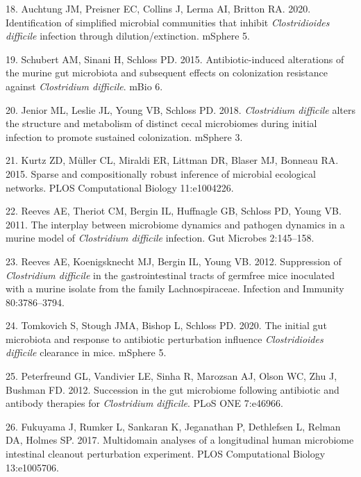 \documentclass[12pt,]{article}
\newlength{\cslhangindent}
\newenvironment{cslreferences}%
  {\setlength{\parindent}{0pt}%
  \everypar{\setlength{\hangindent}{\cslhangindent}}\ignorespaces}%
  {\par}
\begin{document}
\begin{cslreferences}
\leavevmode\hypertarget{ref-auchtung2020}{}%
18. Auchtung JM, Preisner EC, Collins J, Lerma AI, Britton RA. 2020.
Identification of simplified microbial communities that inhibit
\emph{Clostridioides difficile} infection through dilution/extinction.
mSphere 5.

\leavevmode\hypertarget{ref-schubert2015}{}%
19. Schubert AM, Sinani H, Schloss PD. 2015. Antibiotic-induced
alterations of the murine gut microbiota and subsequent effects on
colonization resistance against \emph{Clostridium difficile}. mBio 6.

\leavevmode\hypertarget{ref-jenior2018}{}%
20. Jenior ML, Leslie JL, Young VB, Schloss PD. 2018. \emph{Clostridium
difficile} alters the structure and metabolism of distinct cecal
microbiomes during initial infection to promote sustained colonization.
mSphere 3.

\leavevmode\hypertarget{ref-kurtz2015}{}%
21. Kurtz ZD, Müller CL, Miraldi ER, Littman DR, Blaser MJ, Bonneau RA.
2015. Sparse and compositionally robust inference of microbial
ecological networks. PLOS Computational Biology 11:e1004226.

\leavevmode\hypertarget{ref-reeves2011}{}%
22. Reeves AE, Theriot CM, Bergin IL, Huffnagle GB, Schloss PD, Young
VB. 2011. The interplay between microbiome dynamics and pathogen
dynamics in a murine model of \emph{Clostridium difficile} infection.
Gut Microbes 2:145--158.

\leavevmode\hypertarget{ref-reeves2012}{}%
23. Reeves AE, Koenigsknecht MJ, Bergin IL, Young VB. 2012. Suppression
of \emph{Clostridium difficile} in the gastrointestinal tracts of
germfree mice inoculated with a murine isolate from the family
Lachnospiraceae. Infection and Immunity 80:3786--3794.

\leavevmode\hypertarget{ref-tomkovich2020}{}%
24. Tomkovich S, Stough JMA, Bishop L, Schloss PD. 2020. The initial gut
microbiota and response to antibiotic perturbation influence
\emph{Clostridioides difficile} clearance in mice. mSphere 5.

\leavevmode\hypertarget{ref-peterfreund2012}{}%
25. Peterfreund GL, Vandivier LE, Sinha R, Marozsan AJ, Olson WC, Zhu J,
Bushman FD. 2012. Succession in the gut microbiome following antibiotic
and antibody therapies for \emph{Clostridium difficile}. PLoS ONE
7:e46966.

\leavevmode\hypertarget{ref-fukuyama2017}{}%
26. Fukuyama J, Rumker L, Sankaran K, Jeganathan P, Dethlefsen L, Relman
DA, Holmes SP. 2017. Multidomain analyses of a longitudinal human
microbiome intestinal cleanout perturbation experiment. PLOS
Computational Biology 13:e1005706.


\end{cslreferences}
\end{document}
